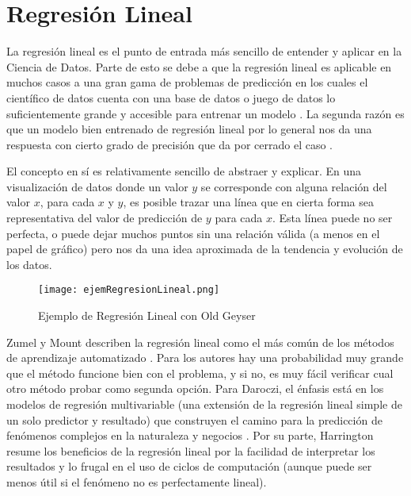 \section{Regresión Lineal}
La regresión lineal es el punto de entrada más sencillo de entender y aplicar en la Ciencia de Datos. Parte de esto se debe a que la regresión lineal es aplicable en muchos casos a una gran gama de problemas de predicción en los cuales el científico de datos cuenta con una base de datos o juego de datos lo suficientemente grande y accesible para entrenar un modelo \cite{daroczi}. La segunda razón es que un modelo bien entrenado de regresión lineal por lo general nos da una respuesta con cierto grado de precisión que da por cerrado el caso \cite{leek}.

El concepto en sí es relativamente sencillo de abstraer y explicar. En una visualización de datos donde un valor $y$ se corresponde con alguna relación del valor $x$, para cada $x$ y $y$, es posible trazar una línea que en cierta forma sea representativa del valor de predicción de $y$ para cada $x$. Esta línea puede no ser perfecta, o puede dejar muchos puntos sin una relación válida (a menos en el papel de gráfico) pero nos da una idea aproximada de la tendencia y evolución de los datos. \\

\begin{figure}[h!]
    \centering
    \texttt{[image: ejemRegresionLineal.png]}
    \caption{Ejemplo de Regresión Lineal con Old Geyser}
\end{figure}

Zumel y Mount describen la regresión lineal como el más común de los métodos de aprendizaje automatizado \cite{zumelMount}. Para los autores hay una probabilidad muy grande que el método funcione bien con el problema, y si no, es muy fácil verificar cual otro método probar como segunda opción. Para Daroczi, el énfasis está en los modelos de regresión multivariable (una extensión de la regresión lineal simple de un solo predictor y resultado) que construyen el camino para la predicción de fenómenos complejos en la naturaleza y negocios \cite{daroczi}. Por su parte, Harrington resume los beneficios de la regresión lineal \cite{harrington} por la facilidad de interpretar los resultados y lo frugal en el uso de ciclos de computación (aunque puede ser menos útil si el fenómeno no es perfectamente lineal).

